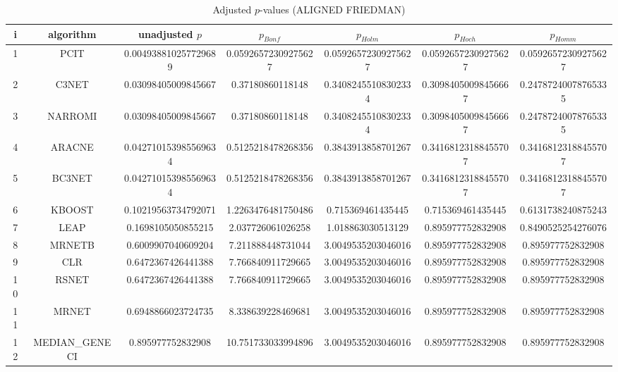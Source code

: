 \documentclass[a4paper,10pt]{article}
\begin{document}
\begin{landscape}
\begin{table}[!htp]
\centering\scriptsize
\caption{Adjusted $p$-values (ALIGNED FRIEDMAN)}
\begin{tabular}{ccccccc}
i&algorithm&unadjusted $p$&$p_{Bonf}$&$p_{Holm}$&$p_{Hoch}$&$p_{Homm}$\\
\hline
1&PCIT&0.004938810257729689&0.05926572309275627&0.05926572309275627&0.05926572309275627&0.05926572309275627\\
2&C3NET&0.03098405009845667&0.37180860118148&0.34082455108302334&0.30984050098456667&0.24787240078765335\\
3&NARROMI&0.03098405009845667&0.37180860118148&0.34082455108302334&0.30984050098456667&0.24787240078765335\\
4&ARACNE&0.042710153985569634&0.5125218478268356&0.3843913858701267&0.34168123188455707&0.34168123188455707\\
5&BC3NET&0.042710153985569634&0.5125218478268356&0.3843913858701267&0.34168123188455707&0.34168123188455707\\
6&KBOOST&0.10219563734792071&1.2263476481750486&0.715369461435445&0.715369461435445&0.6131738240875243\\
7&LEAP&0.1698105050855215&2.037726061026258&1.018863030513129&0.895977752832908&0.8490525254276076\\
8&MRNETB&0.6009907040609204&7.211888448731044&3.0049535203046016&0.895977752832908&0.895977752832908\\
9&CLR&0.6472367426441388&7.766840911729665&3.0049535203046016&0.895977752832908&0.895977752832908\\
10&RSNET&0.6472367426441388&7.766840911729665&3.0049535203046016&0.895977752832908&0.895977752832908\\
11&MRNET&0.6948866023724735&8.338639228469681&3.0049535203046016&0.895977752832908&0.895977752832908\\
12&MEDIAN_GENECI&0.895977752832908&10.751733033994896&3.0049535203046016&0.895977752832908&0.895977752832908\\
\hline
\end{tabular}
\end{table}


\end{landscape}
\end{document}
